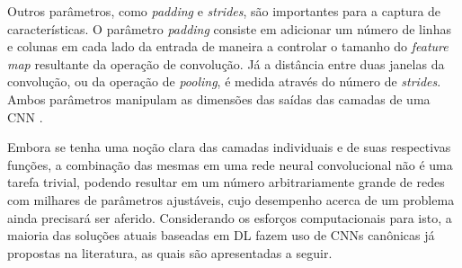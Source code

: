  Outros parâmetros, como \emph{padding} e \emph{strides}, são importantes para a captura de características. O parâmetro \emph{padding} consiste em adicionar um número de linhas e colunas em cada lado da entrada de maneira a controlar o tamanho do \emph{feature map} resultante da operação de convolução. Já a distância entre duas janelas da convolução, ou da operação de \emph{pooling}, é medida através do número de \emph{strides}. Ambos parâmetros manipulam as dimensões das saídas das camadas de uma CNN \cite{chollet2017deep}.

Embora se tenha uma noção clara das camadas individuais e de suas respectivas funções, a combinação das mesmas em uma rede neural convolucional não é uma tarefa trivial, podendo resultar em um número arbitrariamente grande de redes com milhares de parâmetros ajustáveis, cujo desempenho acerca de um problema ainda precisará ser aferido. Considerando os esforços computacionais para isto, a maioria das soluções atuais baseadas em DL fazem uso de CNNs canônicas já propostas na literatura, as quais são apresentadas a seguir.
